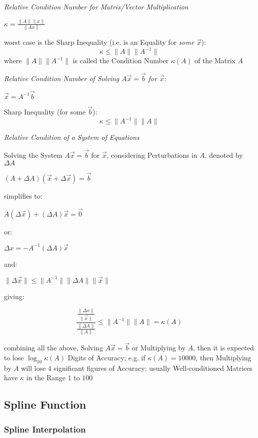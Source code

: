 \emph{Relative Condition Number for Matrix/Vector Multiplication}

$\kappa = \frac{\|A\|\|x\|}{\|Ax\|}$

worst case is the Sharp Inequality (i.e. is an Equality for \emph{some}
$\vec{x}$):
\[
  \kappa \leq \|A\| \|A^{-1}\|
\]
where $\|A\|\|A^{-1}\|$ is called the Condition Number $\kappa(A)$ of the
Matrix $A$


\emph{Relative Condition Number of Solving $A\vec{x} = \vec{b}$ for $\vec{x}$}:

$\vec{x} = A^{-1}\vec{b}$

Sharp Inequality (for some $\vec{b}$):
\[
  \kappa \leq \|A^{-1}\| \|A\|
\]


\emph{Relative Condition of a System of Equations}

Solving the System $A\vec{x} = \vec{b}$ for $\vec{x}$, considering
Perturbations in $A$, denoted by $\Delta A$

$(A + \Delta A)(\vec{x} + \Delta\vec{x}) = \vec{b}$

simplifies to:

$A(\Delta\vec{x}) + (\Delta A)\vec{x} = \vec{0}$

or:

$\Delta x = -A^{-1}(\Delta A)\vec{x}$

and:

$\|\Delta\vec{x}\| \leq \|A^{-1}\| \|\Delta{A}\| \|\vec{x}\|$

giving:

\[
  \frac{
    \frac{\|\Delta{x}\|}{\|\vec{x}\|}
  }{
    \frac{\|\Delta{A}\|}{\|A\|}
  }
  \leq \|A^{-1}\|\|A\| = \kappa(A)
\]

combining all the above, Solving $A\vec{x} = \vec{b}$ or Multiplying by $A$,
then it is expected to lose $\log_{10} \kappa(A)$ Digits of Accuracy; e.g. if
$\kappa(A) = 10000$, then Multiplying by $A$ will lose $4$ significant figures
of Accuracy; usually Well-conditioned Matrices have $\kappa$ in the Range $1$
to $100$



\subsection{Spline Function}\label{sec:spline}

\subsubsection{Spline Interpolation}\label{sec:spline_interpolation}

